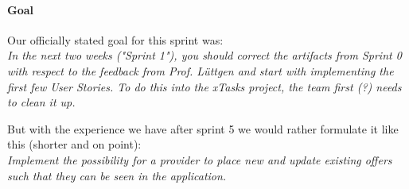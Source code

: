 \paragraph{Goal}
Our officially stated goal for this sprint was:\\
\textit{In the next two weeks ("Sprint 1"), you should correct the artifacts from Sprint 0 with respect to the feedback from Prof. Lüttgen and start with implementing the first few User Stories. To do this into the xTasks project, the team first (?) needs to clean it up.}

But with the experience we have after sprint 5 we would rather formulate it like this (shorter and on point):\\
\textit{Implement the possibility for a provider to place new and update existing offers such that they can be seen in the application.}








